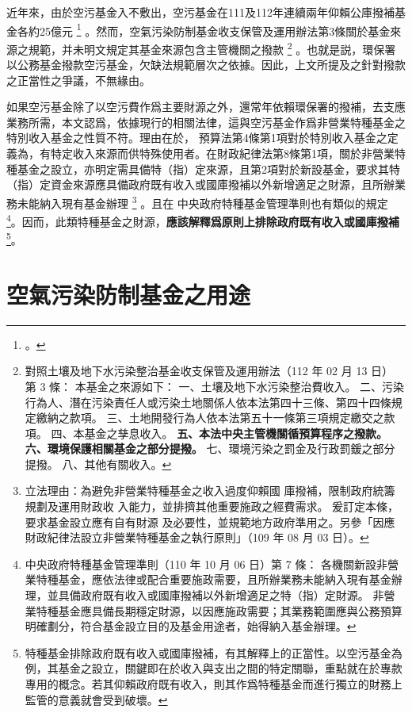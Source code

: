 \documentclass[12pt,a4paper]{article}
\begin{document}
近年來，由於空污基金入不敷出，空污基金在111及112年連續兩年仰賴公庫撥補基金各約25億元
\footnote{。}
。然而，空氣污染防制基金收支保管及運用辦法第3條關於基金來源之規範，并未明文規定其基金來源包含主管機關之撥款
\footnote{
對照土壤及地下水污染整治基金收支保管及運用辦法（112 年 02 月 13 日）
第 3 條：
本基金之來源如下：
一、土壤及地下水污染整治費收入。
二、污染行為人、潛在污染責任人或污染土地關係人依本法第四十三條、第四十四條規定繳納之款項。
三、土地開發行為人依本法第五十一條第三項規定繳交之款項。
四、本基金之孳息收入。
\textbf{五、本法中央主管機關循預算程序之撥款。
六、環境保護相關基金之部分提撥。}
七、環境污染之罰金及行政罰鍰之部分提撥。
八、其他有關收入。}
。也就是説，環保署以公務基金撥款空污基金，欠缺法規範層次之依據。因此，上文所提及之針對撥款之正當性之爭議，不無緣由。

如果空污基金除了以空污費作爲主要財源之外，還常年依賴環保署的撥補，去支應業務所需，本文認爲，依據現行的相關法律，這與空污基金作爲非營業特種基金之特別收入基金之性質不符。理由在於，
預算法第4條第1項對於特別收入基金之定義為，有特定收入來源而供特殊使用者。在財政紀律法第8條第1項，關於非營業特種基金之設立，亦明定需具備特（指）定來源，且第2項對於新設基金，要求其特（指）定資金來源應具備政府既有收入或國庫撥補以外新增適足之財源，且所辦業務未能納入現有基金辦理
\footnote{立法理由：為避免非營業特種基金之收入過度仰賴國
庫撥補，限制政府統籌規劃及運用財政收
入能力，並排擠其他重要施政之經費需求。
爰訂定本條，要求基金設立應有自有財源
及必要性，並規範地方政府準用之。另參「因應財政紀律法設立非營業特種基金之執行原則」（109 年 08 月 03 日）。}
。且在	中央政府特種基金管理準則也有類似的規定
\footnote{	中央政府特種基金管理準則（110 年 10 月 06 日）第 7 條：
各機關新設非營業特種基金，應依法律或配合重要施政需要，且所辦業務未能納入現有基金辦理，並具備政府既有收入或國庫撥補以外新增適足之特（指）定財源。
非營業特種基金應具備長期穩定財源，以因應施政需要；其業務範圍應與公務預算明確劃分，符合基金設立目的及基金用途者，始得納入基金辦理。}。因而，此類特種基金之財源，\textbf{應該解釋爲原則上排除政府既有收入或國庫撥補}\footnote{特種基金排除政府既有收入或國庫撥補，有其解釋上的正當性。以空污基金為例，其基金之設立，關鍵即在於收入與支出之間的特定關聯，重點就在於專款專用的概念。若其仰賴政府既有收入，則其作爲特種基金而進行獨立的財務上監管的意義就會受到破壞。
}。

\section{空氣污染防制基金之用途}


\end{document}
